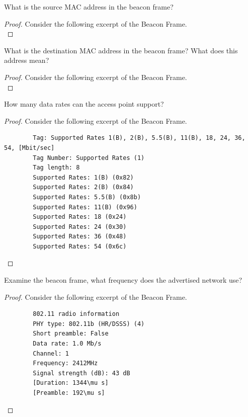 \documentclass[../main.tex]{subfiles}
\begin{document}
\begin{wts}
    What is the source MAC address in the beacon frame?
\end{wts}
\begin{proof}
Consider the following excerpt of the Beacon Frame.\\
\end{proof}
\newpage

\begin{wts}
   What is the destination MAC address in the beacon frame? What does this address mean?
\end{wts}
\begin{proof}
Consider the following excerpt of the Beacon Frame.\\
\end{proof}
\newpage

\begin{wts}
   How many data rates can the access point support?
\end{wts}
\begin{proof}
Consider the following excerpt of the Beacon Frame.
    \begin{lstlisting}
        Tag: Supported Rates 1(B), 2(B), 5.5(B), 11(B), 18, 24, 36, 54, [Mbit/sec]
        Tag Number: Supported Rates (1)
        Tag length: 8
        Supported Rates: 1(B) (0x82)
        Supported Rates: 2(B) (0x84)
        Supported Rates: 5.5(B) (0x8b)
        Supported Rates: 11(B) (0x96)
        Supported Rates: 18 (0x24)
        Supported Rates: 24 (0x30)
        Supported Rates: 36 (0x48)
        Supported Rates: 54 (0x6c)\end{lstlisting}
\end{proof}
\newpage

\begin{wts}
   Examine the beacon frame, what frequency does the advertised network use?
\end{wts}
\begin{proof}
Consider the following excerpt of the Beacon Frame.
    \begin{lstlisting}
        802.11 radio information
        PHY type: 802.11b (HR/DSSS) (4)
        Short preamble: False
        Data rate: 1.0 Mb/s
        Channel: 1
        Frequency: 2412MHz
        Signal strength (dB): 43 dB
        [Duration: 1344\mu s]
        [Preamble: 192\mu s]\end{lstlisting}
\end{proof}
\newpage
\end{document}
